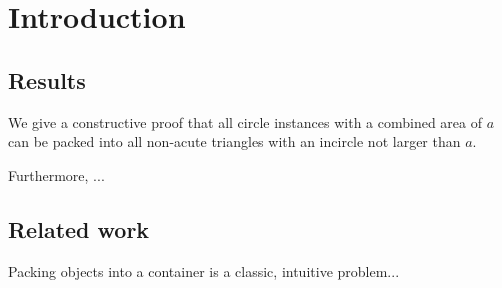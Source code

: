 \chapter{Introduction}

%
%
%
%
%
%


\section{Results}

We give a constructive proof that all circle instances with a combined area of $a$ can be packed into all non-acute triangles with an incircle not larger than $a$.

Furthermore, ...

\section{Related work}

Packing objects into a container is a classic, intuitive problem...

